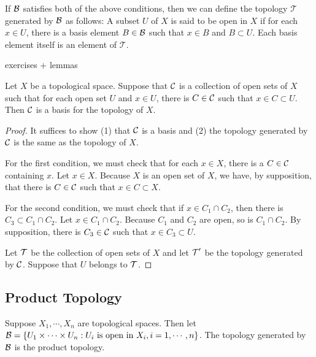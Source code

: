 \documentclass{article}
\begin{document}
\begin{remark}
  If $\operatorname{\mathcal{B}}$ satisfies both of the above conditions, then we can define the topology $\mathcal{T}$ generated by $\operatorname{\mathcal{B}}$ as follows: A subset $U$ of $X$ is said to be open in $X$ if for each $x \in U$, there is a basis element $B \in \operatorname{\mathcal{B}}$ such that $x \in B$ and $B \subset U$. Each basis element itself is an element of $\mathcal{T}$.
\end{remark}

exercises + lemmas

\begin{lemma}[Munkres]
 Let $X$ be a topological space. Suppose that $\operatorname{\mathcal{C}}$ is a collection of open sets of $X$ such that for each open set $U$ and $x \in U$, there is $C \in \operatorname{\mathcal{C}}$ such that $x \in C \subset U$. Then $\mathcal{C}$ is a basis for the topology of $X$.
\end{lemma}
\begin{proof}

  It suffices to show (1) that $\operatorname{\mathcal{C}}$ is a basis and (2) the topology generated by $\operatorname{\mathcal{C}}$ is the same as the topology of $X$.


  For the first condition, we must check that for each $x \in X$, there is a $C \in \operatorname{\mathcal{C}}$ containing $x$. Let $x \in X$. Because $X$ is an open set of $X$, we have, by supposition, that there is $C \in \operatorname{\mathcal{C}}$ such that $x \in C \subset X$.

  For the second condition, we must check that if $x \in C_{1} \cap C_{2}$, then there is $C_{3} \subset C_{1} \cap C_{2}$. Let $x \in C_{1} \cap C_{2}$. Because $C_{1}$ and $C_{2}$ are open, so is $C_{1} \cap C_{2}$. By supposition, there is $C_{3} \in \operatorname{\mathcal{C}}$ such that $x \in C_{3} \subset U$.



  Let $\operatorname{\mathcal{T}}$ be the collection of open sets of $X$ and let $\operatorname{\mathcal{T}}'$ be the topology generated by $\operatorname{\mathcal{C}}$. Suppose that $U$ belongs to $\operatorname{\mathcal{T}}$.
\end{proof}

\subsection{Product Topology}

\begin{definition}[Lee]
  Suppose $X_{1}, \cdots, X_{n}$ are topological spaces. Then let $\operatorname{\mathcal{B}} = \{ U_{1} \times \cdots \times U_{n} : U_{i} \text{ is open in } X_{i}, i = 1, \cdots, n\}$. The topology generated by $\operatorname{\mathcal{B}}$ is the product topology.
\end{definition}
\end{document}
